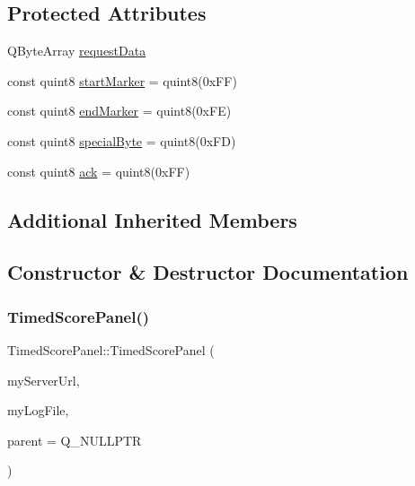 \subsection*{Protected Attributes}
\begin{DoxyCompactItemize}
\item 
Q\+Byte\+Array \mbox{\hyperlink{classTimedScorePanel_ab709153aa0a1ea23d2209c359b3adfe0}{request\+Data}}
\item 
const quint8 \mbox{\hyperlink{classTimedScorePanel_ad6785d83eabd109d61604d1893703b25}{start\+Marker}} = quint8(0x\+F\+F)
\item 
const quint8 \mbox{\hyperlink{classTimedScorePanel_a1233e5ee97ca72e98b37c5fc81a2a94d}{end\+Marker}} = quint8(0x\+F\+E)
\item 
const quint8 \mbox{\hyperlink{classTimedScorePanel_a59e028723640161364bf730557737b54}{special\+Byte}} = quint8(0x\+F\+D)
\item 
const quint8 \mbox{\hyperlink{classTimedScorePanel_a58f99170c990833d0fd52e33015a1da1}{ack}} = quint8(0x\+F\+F)
\end{DoxyCompactItemize}
\subsection*{Additional Inherited Members}


\subsection{Constructor \& Destructor Documentation}
\mbox{\label{classTimedScorePanel_ac8b702def5462d859d6aa9d430d3aa86}} 
\subsubsection{\texorpdfstring{Timed\+Score\+Panel()}{TimedScorePanel()}}
{\footnotesize\ttfamily Timed\+Score\+Panel\+::\+Timed\+Score\+Panel (\begin{DoxyParamCaption}\item[{Q\+String}]{my\+Server\+Url,  }\item[{Q\+File $\ast$}]{my\+Log\+File,  }\item[{Q\+Widget $\ast$}]{parent = {\ttfamily Q\+\_\+NULLPTR} }\end{DoxyParamCaption})}



